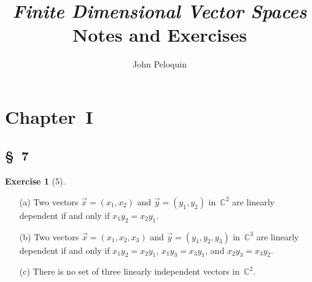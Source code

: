 \documentclass[letterpaper,12pt]{article}
\title{\textit{Finite Dimensional Vector Spaces}\\Notes and Exercises}
\author{John Peloquin}
\date{}
\newcommand{\C}{\mathbb{C}}
\theoremstyle{definition}
\newtheorem*{exer}{Exercise}
\theoremstyle{remark}
\theoremstyle{direction}
\begin{document}
\maketitle
\section*{Chapter~I}
\subsection*{\S~7}
\begin{exer}[5]\
\begin{enumerate}
\item[(a)] Two vectors \(\vec{x}=(x_1,x_2)\) and \(\vec{y}=(y_1,y_2)\) in~\(\C^2\) are linearly dependent if and only if \(x_1y_2=x_2y_1\).
\item[(b)] Two vectors \(\vec{x}=(x_1,x_2,x_3)\) and \(\vec{y}=(y_1,y_2,y_3)\) in~\(\C^3\) are linearly dependent if and only if \(x_1y_2=x_2y_1\), \(x_1y_3=x_3y_1\), and \(x_2y_3=x_3y_2\).
\item[(c)] There is no set of three linearly independent vectors in~\(\C^2\).
\end{enumerate}
\end{exer}
\end{document}
